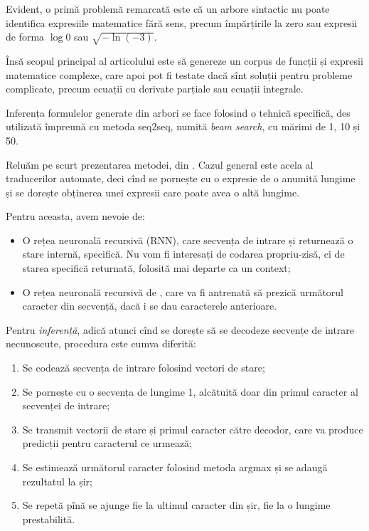 Evident, o primă problemă remarcată este că un arbore sintactic nu poate
identifica expresiile matematice fără sens, precum împărțirile la zero
sau expresii de forma $ \log 0 $ sau $ \sqrt{-\ln (-3)} $.

Însă scopul principal al articolului este să genereze un corpus de funcții
și expresii matematice complexe, care apoi pot fi testate dacă sînt soluții
pentru probleme complicate, precum ecuații cu derivate parțiale sau ecuații
integrale.

Inferența formulelor generate din arbori se face folosind o tehnică
specifică, des utilizată împreună cu metoda seq2seq, numită
\emph{beam search}, cu mărimi de 1, 10 și 50.

Reluăm pe scurt prezentarea metodei, din \cite{chollet}. Cazul general
este acela al traducerilor automate, deci cînd se pornește cu o expresie
de o anumită lungime și se dorește obținerea unei expresii care poate avea
o altă lungime.

Pentru aceasta, avem nevoie de:
\begin{itemize}
    \item O rețea neuronală recursivă (RNN), care  secvența de
        intrare și returnează o stare internă, specifică. Nu vom fi
        interesați de codarea propriu-zisă, ci de starea specifică returnată,
        folosită mai departe ca un context;
    \item O rețea neuronală recursivă de , care va fi
        antrenată să prezică următorul caracter din secvență, dacă i se
        dau caracterele anterioare.
\end{itemize}

Pentru \emph{inferență}, adică atunci cînd se dorește să se decodeze
secvențe de intrare necunoscute, procedura este cumva diferită:
\begin{enumerate}[(1)]
    \item Se codează secvența de intrare folosind vectori de stare;
    \item Se pornește cu o secvența de lungime 1, alcătuită doar
        din primul caracter al secvenței de intrare;
    \item Se transmit vectorii de stare și primul caracter către
        decodor, care va produce predicții pentru caracterul ce
        urmează;
    \item Se estimează următorul caracter folosind metoda
        argmax și se adaugă rezultatul la șir;
    \item Se repetă pînă se ajunge fie la ultimul caracter din
        șir, fie la o lungime prestabilită.
\end{enumerate}

